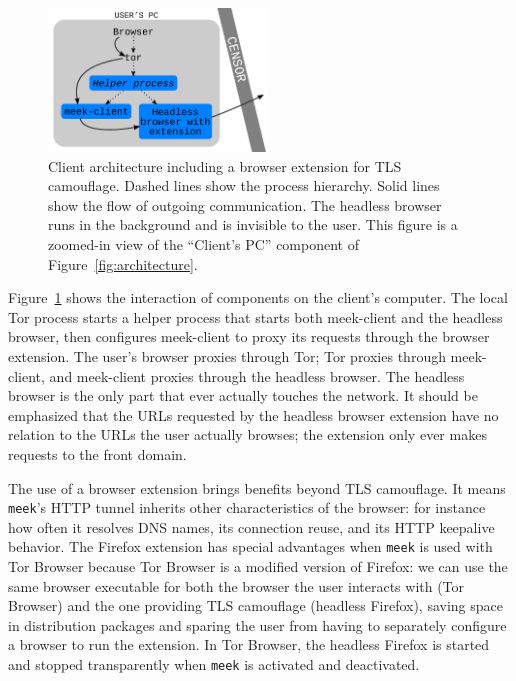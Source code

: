 \documentclass[conference]{IEEEtran}
\newcommand{\meekclient}{\mbox{meek-client}\xspace}
\newcommand{\meek}{\texttt{meek}\xspace}
\begin{document}
\begin{figure}
\centering
\includegraphics[height=1.5in]{browser-architecture}
\caption{
Client architecture including a browser extension for TLS camouflage.
Dashed lines show the process hierarchy.
Solid lines show the flow of outgoing communication.
The headless browser runs in the background and is invisible to the user.
This figure is a zoomed-in view of the ``Client's PC'' component of Figure~\ref{fig:architecture}.
}
\label{fig:browser-architecture}
\end{figure}

Figure~\ref{fig:browser-architecture} shows the interaction of components
on the client's computer.
The local Tor process starts a helper process that starts both \meekclient
and the headless browser,
then configures \meekclient to proxy its requests through the browser extension.
The user's browser proxies through Tor;
Tor proxies through \meekclient,
and \meekclient proxies through the headless browser.
The headless browser is the only part that ever actually touches the network.
It should be emphasized that the URLs requested by the headless browser extension
have no relation to the URLs the user actually browses;
the extension only ever makes requests to the front domain.

The use of a browser extension brings benefits beyond TLS camouflage.
It means \meek's HTTP tunnel inherits other characteristics of the browser:
for instance
how often it resolves DNS names,
its connection reuse,
and its HTTP keepalive behavior.
The Firefox extension has special advantages
when \meek is used with Tor Browser
because Tor Browser
is a modified version of Firefox:
we can use the same browser executable for both the browser the user interacts with (Tor Browser)
and the one providing TLS camouflage (headless Firefox),
saving space in distribution packages
and sparing the user from having to separately configure a browser to run the extension.
In Tor Browser,
the headless Firefox is started and stopped transparently
when \meek is activated and deactivated.

\end{document}

